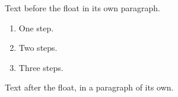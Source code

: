 \documentclass[10pt]{article}
\begin{document}
Text before the float in its own paragraph.

\begin{table}[t]
\begin{enumerate}
\item One step.
\item Two steps.
\item Three steps.
\end{enumerate}
\caption{An enumerate at the top of a table.}
\end{table}

Text after the float, in a paragraph of its own.
\end{document}
